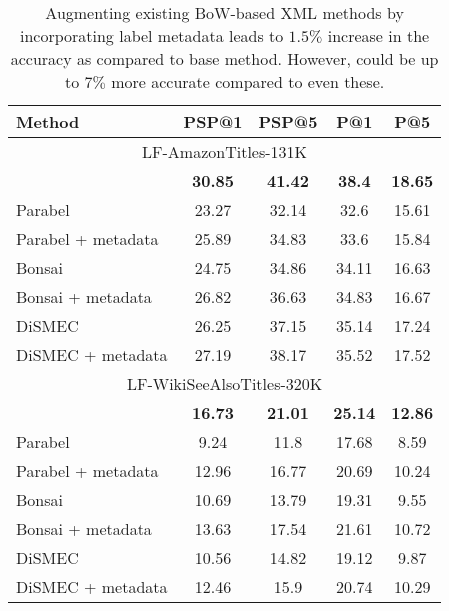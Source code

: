 
\begin{table}
    \caption{Augmenting existing BoW-based XML methods by incorporating label metadata leads to $1.5\%$ increase in the accuracy as compared to base method. However, \alg could be up to $7\%$ more accurate compared to even these.}
    \label{tab:bowmeta}
      \centering
        \begin{tabular}{@{}l|cc|cc@{}}
        \toprule
         \textbf{Method} & \textbf{PSP@1}  & \textbf{PSP@5} & \textbf{P@1}  & \textbf{P@5} \\
        \midrule
        \multicolumn{5}{c}{LF-AmazonTitles-131K}\\ \midrule					
\alg	 & \textbf{30.85}	 & \textbf{41.42}	 & \textbf{38.4}	 & \textbf{18.65} \\
\midrule
Parabel	 & 23.27	 & 32.14	 & 32.6	 & 15.61 \\
Parabel + metadata	 & 25.89	 & 34.83	 & 33.6	 & 15.84 \\
\midrule
Bonsai	 & 24.75	 & 34.86	 & 34.11	 & 16.63 \\
Bonsai + metadata	 & 26.82	 & 36.63	 & 34.83	 & 16.67 \\
\midrule
DiSMEC	 & 26.25	 & 37.15	 & 35.14	 & 17.24 \\
DiSMEC + metadata	 & 27.19	 & 38.17	 & 35.52	 & 17.52 \\
    \midrule 
    \multicolumn{5}{c}{LF-WikiSeeAlsoTitles-320K}\\ \midrule					
\alg	 & \textbf{16.73}	 & \textbf{21.01}	 & \textbf{25.14}	 & \textbf{12.86} \\
\midrule
Parabel	 & 9.24	 & 11.8	 & 17.68	 & 8.59	 \\
Parabel + metadata	 & 12.96	 & 16.77	 & 20.69	 & 10.24 \\
\midrule
Bonsai	 & 10.69	 & 13.79	 & 19.31	 & 9.55	 \\
Bonsai + metadata	 & 13.63	 & 17.54	 & 21.61	 & 10.72 \\
\midrule
DiSMEC	 & 10.56	 & 14.82	 & 19.12	 & 9.87	\\
DiSMEC + metadata	 & 12.46	 & 15.9	 & 20.74	 & 10.29\\
\bottomrule
    \end{tabular}
\end{table}



